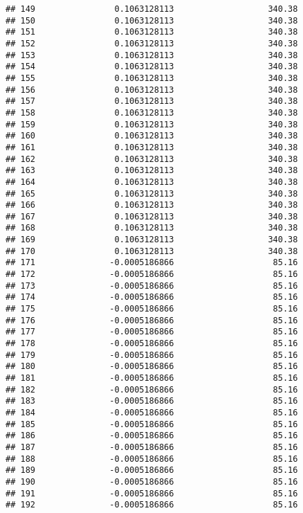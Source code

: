 \documentclass[]{article}
\begin{document}
\begin{verbatim}
## 149                0.1063128113                   340.38
## 150                0.1063128113                   340.38
## 151                0.1063128113                   340.38
## 152                0.1063128113                   340.38
## 153                0.1063128113                   340.38
## 154                0.1063128113                   340.38
## 155                0.1063128113                   340.38
## 156                0.1063128113                   340.38
## 157                0.1063128113                   340.38
## 158                0.1063128113                   340.38
## 159                0.1063128113                   340.38
## 160                0.1063128113                   340.38
## 161                0.1063128113                   340.38
## 162                0.1063128113                   340.38
## 163                0.1063128113                   340.38
## 164                0.1063128113                   340.38
## 165                0.1063128113                   340.38
## 166                0.1063128113                   340.38
## 167                0.1063128113                   340.38
## 168                0.1063128113                   340.38
## 169                0.1063128113                   340.38
## 170                0.1063128113                   340.38
## 171               -0.0005186866                    85.16
## 172               -0.0005186866                    85.16
## 173               -0.0005186866                    85.16
## 174               -0.0005186866                    85.16
## 175               -0.0005186866                    85.16
## 176               -0.0005186866                    85.16
## 177               -0.0005186866                    85.16
## 178               -0.0005186866                    85.16
## 179               -0.0005186866                    85.16
## 180               -0.0005186866                    85.16
## 181               -0.0005186866                    85.16
## 182               -0.0005186866                    85.16
## 183               -0.0005186866                    85.16
## 184               -0.0005186866                    85.16
## 185               -0.0005186866                    85.16
## 186               -0.0005186866                    85.16
## 187               -0.0005186866                    85.16
## 188               -0.0005186866                    85.16
## 189               -0.0005186866                    85.16
## 190               -0.0005186866                    85.16
## 191               -0.0005186866                    85.16
## 192               -0.0005186866                    85.16

\end{verbatim}
\end{document}
